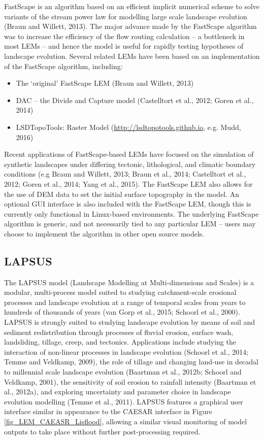 FastScape is an algorithm based on an efficient implicit numerical scheme to solve variants of the stream power law for modelling large scale landscape evolution (Braun and Willett, 2013). The major advance made by the FastScape algorithm was to increase the efficiency of the flow routing calculation – a bottleneck in most LEMs – and hence the model is useful for rapidly testing hypotheses of landscape evolution. Several related LEMs have been based on an implementation of the FastScape algorithm, including:

\begin{itemize}
\item The `original' FastScape LEM (Braun and Willett, 2013)
\item DAC – the Divide and Capture model (Castelltort et al., 2012; Goren et al., 2014)
\item LSDTopoTools: Raster Model (\url{http://lsdtopotools.github.io}, e.g. Mudd, 2016)
\end{itemize}
Recent applications of FastScape-based LEMs have focused on the simulation of synthetic landscapes under differing tectonic, lithological, and climatic boundary conditions (e.g Braun and Willett, 2013; Braun et al., 2014; Castelltort et al., 2012; Goren et al., 2014; Yang et al., 2015). The FastScape LEM also allows for the use of DEM data to set the initial surface topography in the model. An optional GUI interface is also included with the FastScape LEM, though this is currently only functional in Linux-based environments. The underlying FastScape algorithm is generic, and not necessarily tied to any particular LEM – users may choose to implement the algorithm in other open source models.

\subsection{LAPSUS}
The LAPSUS model (Landscape Modelling at Multi-dimensions and Scales) is a modular, multi-process model suited to studying catchment-scale erosional processes and landscape evolution at a range of temporal scales from years to hundreds of thousands of years  (van Gorp et al., 2015; Schoorl et al., 2000). LAPSUS is strongly suited to studying landscape evolution by means of soil and sediment redistribution through processes of fluvial erosion, surface wash, landsliding, tillage, creep, and tectonics. Applications include studying the interaction of non-linear processes in landscape evolution (Schoorl et al., 2014; Temme and Veldkamp, 2009), the role of tillage and changing land-use in decadal to millennial scale landscape evolution (Baartman et al., 2012b; Schoorl and Veldkamp, 2001), the sensitivity of soil erosion to rainfall intensity (Baartman et al., 2012a), and exploring uncertainty and parameter choice in landscape evolution modelling (Temme et al., 2011). LAPSUS features a graphical user interface similar in appearance to the CAESAR interface in Figure \ref{fig_LEM_CAEASR_Lisflood}, allowing a similar visual monitoring of model outputs to take place without further post-processing required.  

